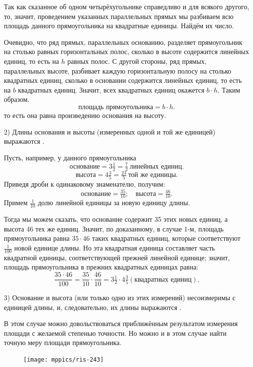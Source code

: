 \documentclass[oneside]{book}
\begin{document}
Так как сказанное об одном четырёхугольнике справедливо и для всякого другого, то, значит, проведением указанных параллельных прямых мы разбиваем всю площадь данного прямоугольника на квадратные единицы.
Найдём их число.

Очевидно, что ряд прямых, параллельных основанию, разделяет прямоугольник на столько равных горизонтальных полос, сколько в высоте содержится линейных единиц, то есть на $h$ равных полос.
С другой стороны, ряд прямых, параллельных высоте, разбивает каждую горизонтальную полосу на столько квадратных единиц, сколько в основании содержится линейных единиц, то есть на $b$ квадратных единиц.
Значит, всех квадратных единиц окажется $b\cdot h$.
Таким образом.
\[\text{площадь прямоугольника} = b\cdot h.\]
то есть она равна произведению основания на высоту.

2) Длины основания и высоты (измеренных одной и той же единицей) выражаются .

Пусть, например, у данного прямоугольника
\[\text{основание} = 3\tfrac12=\tfrac72~\text{линейных единиц.}\]
\[\text{высота} = 4\tfrac35 = \tfrac{23}5~\text{той же единицы.}\]
Приведя дроби к одинаковому знаменателю, получим:
\[\text{основание} = \tfrac{35}{10};
\quad
\text{высота} = \tfrac{46}{10}.
\]
Примем $\tfrac1{10}$ долю линейной единицы за новую единицу длины.

Тогда мы можем сказать, что основание содержит 35 этих новых единиц, а высота 46 тех же единиц.
Значит, по доказанному, в случае 1-м, площадь прямоугольника равна $35 \cdot 46$ таких квадратных единиц, которые соответствуют $\tfrac1{100}$ новой единице длины.
Но эта квадратная единица составляет часть квадратной единицы, соответствующей прежней линейной единице;
значит, площадь прямоугольника в прежних квадратных единицах равна:
\[\frac{35\cdot 46}{100}=\frac{35}{10}\cdot\frac{46}{10}=3\tfrac12\cdot4\tfrac35(\text{квадратных единиц}).\]

3) Основание и высота (или только одно из этих измерений) несоизмеримы с единицей длины, и, следовательно, их длины выражаются .

В этом случае можно довольствоваться приближённым результатом измерения площади с желаемой степенью точности.
Но можно и в этом случае найти точную меру площади прямоугольника.

\begin{figure}
\centering
\texttt{[image: mppics/ris-243]}
\caption{}\label{1938/ris-243}
\end{figure}
\end{document}
